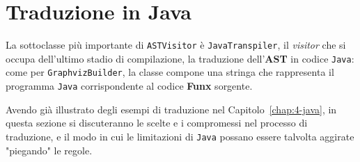 \section{Traduzione in Java}
\label{sec:5-10-java-translation}

La sottoclasse più importante di \texttt{ASTVisitor} è \texttt{JavaTranspiler}, il \textit{visitor} che si occupa
dell'ultimo stadio di compilazione, la traduzione dell'\textbf{AST} in codice \texttt{Java}:
come per \texttt{GraphvizBuilder}, la classe compone una stringa
che rappresenta il programma \texttt{Java} corrispondente al codice \textbf{Funx} sorgente.


Avendo già illustrato degli esempi di traduzione nel Capitolo~\ref{chap:4-java}, in questa sezione si
discuteranno le scelte e i compromessi nel processo di traduzione, e il modo in cui le limitazioni
di \texttt{Java} possano essere talvolta aggirate "piegando" le regole.



\newpage








